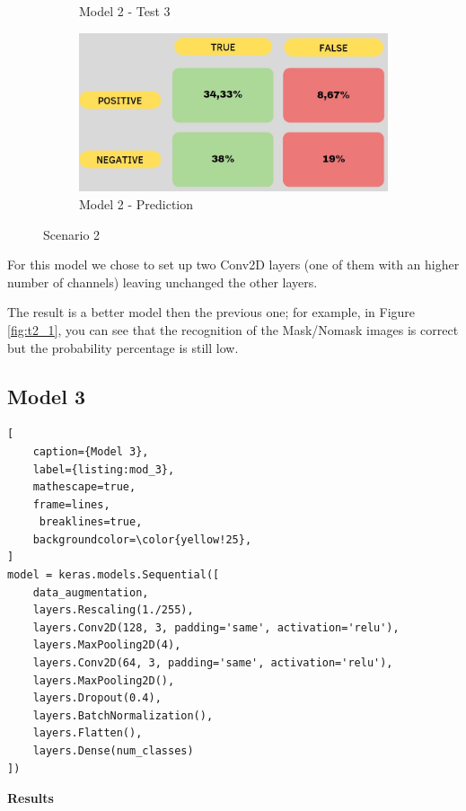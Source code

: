 \documentclass[a4paper,12pt]{article}
\begin{document}
\begin{figure}
\begin{subfigure}{6cm}
        \caption{ Model 2 - Test 3}
    \end{subfigure}
    \begin{subfigure}{6cm}
        \includegraphics[width=\linewidth]{images_latex/model2.jpg}
        \caption{ Model 2 - Prediction}
    \end{subfigure}
    \caption{Scenario 2}
\end{figure}

For this model we chose to set up two Conv2D layers (one of them with an higher number of channels) leaving unchanged the other layers. 

The result is a better model then the previous one; for example, in Figure \ref{fig:t2_1}, you can see that the recognition of the Mask/Nomask images is correct but the probability percentage is still low. 
\newpage
\subsection{Model 3}
\begin{lstlisting}[
    caption={Model 3},
    label={listing:mod_3},
    mathescape=true, 
    frame=lines,
     breaklines=true,
    backgroundcolor=\color{yellow!25},
]
model = keras.models.Sequential([
    data_augmentation,
    layers.Rescaling(1./255), 
    layers.Conv2D(128, 3, padding='same', activation='relu'),
    layers.MaxPooling2D(4),
    layers.Conv2D(64, 3, padding='same', activation='relu'),
    layers.MaxPooling2D(),
    layers.Dropout(0.4),
    layers.BatchNormalization(), 
    layers.Flatten(),
    layers.Dense(num_classes)
])
\end{lstlisting}

\textbf{Results}
\end{document}
